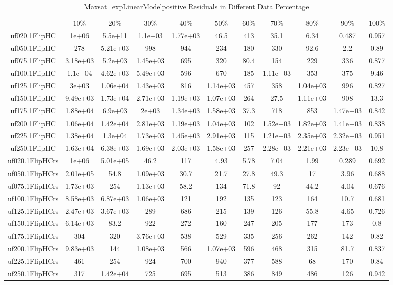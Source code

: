 \begin{table}[htbp]
\caption{Maxsat_expLinearModelpositive Residuals in Different Data Percentage}
\centering
\begin{tabular}{|ccccccccccc|}
\hline
 & $10\%$ & $20\%$ & $30\%$ & $40\%$ & $50\%$ & $60\%$ & $70\%$ & $80\%$ & $90\%$ & $100\%$ \\
uf020.1FlipHC & 1e+06 & 5.5e+11 & 1.1e+03 & 1.77e+03 & 46.5 &  413 & 35.1 & 6.34 & 0.487 & 0.957 \\
uf050.1FlipHC &  278 & 5.21e+03 &  998 &  944 &  234 &  180 &  330 & 92.6 &  2.2 & 0.89 \\
uf075.1FlipHC & 3.18e+03 & 5.2e+03 & 1.45e+03 &  695 &  320 & 80.4 &  154 &  229 &  336 & 0.877 \\
uf100.1FlipHC & 1.1e+04 & 4.62e+03 & 5.49e+03 &  596 &  670 &  185 & 1.11e+03 &  353 &  375 & 9.46 \\
uf125.1FlipHC & 3e+03 & 1.06e+04 & 1.43e+03 &  816 & 1.14e+03 &  457 &  358 & 1.04e+03 &  996 & 0.827 \\
uf150.1FlipHC & 9.49e+03 & 1.73e+04 & 2.71e+03 & 1.19e+03 & 1.07e+03 &  264 & 27.5 & 1.11e+03 &  908 & 13.3 \\
uf175.1FlipHC & 1.88e+04 & 6.9e+03 & 2e+03 & 1.34e+03 & 1.58e+03 & 37.3 &  718 &  853 & 1.47e+03 & 0.842 \\
uf200.1FlipHC & 1.06e+04 & 1.42e+04 & 2.81e+03 & 1.19e+03 & 1.04e+03 &  102 & 1.52e+03 & 1.82e+03 & 1.41e+03 & 0.838 \\
uf225.1FlipHC & 1.38e+04 & 1.3e+04 & 1.73e+03 & 1.45e+03 & 2.91e+03 &  115 & 1.21e+03 & 2.35e+03 & 2.32e+03 & 0.951 \\
uf250.1FlipHC & 1.63e+04 & 6.38e+03 & 1.69e+03 & 2.03e+03 & 1.58e+03 &  257 & 2.28e+03 & 2.21e+03 & 2.23e+03 & 10.8 \\
uf020.1FlipHCrs & 1e+06 & 5.01e+05 & 46.2 &  117 & 4.93 & 5.78 & 7.04 & 1.99 & 0.289 & 0.692 \\
uf050.1FlipHCrs & 2.01e+05 & 54.8 & 1.09e+03 & 30.7 & 21.7 & 27.8 & 49.3 &   17 & 3.96 & 0.688 \\
uf075.1FlipHCrs & 1.73e+03 &  254 & 1.13e+03 & 58.2 &  134 & 71.8 &   92 & 44.2 & 4.04 & 0.676 \\
uf100.1FlipHCrs & 8.58e+03 & 6.87e+03 & 1.06e+03 &  121 &  192 &  135 &  123 &  164 & 10.7 & 0.681 \\
uf125.1FlipHCrs & 2.47e+03 & 3.67e+03 &  289 &  686 &  215 &  139 &  126 & 55.8 & 4.65 & 0.726 \\
uf150.1FlipHCrs & 6.14e+03 & 83.2 &  922 &  272 &  160 &  247 &  205 &  177 &  173 &  0.8 \\
uf175.1FlipHCrs &  304 &  320 & 3.76e+03 &  538 &  529 &  335 &  256 &  262 &  142 & 0.82 \\
uf200.1FlipHCrs & 9.83e+03 &  144 & 1.08e+03 &  566 & 1.07e+03 &  596 &  468 &  315 & 81.7 & 0.837 \\
uf225.1FlipHCrs &  461 &  254 &  924 &  700 &  940 &  377 &  588 &   68 &  170 & 0.84 \\
uf250.1FlipHCrs &  317 & 1.42e+04 &  725 &  695 &  513 &  386 &  849 &  486 &  126 & 0.942 \\
\hline
\end{tabular}
\end{table}
